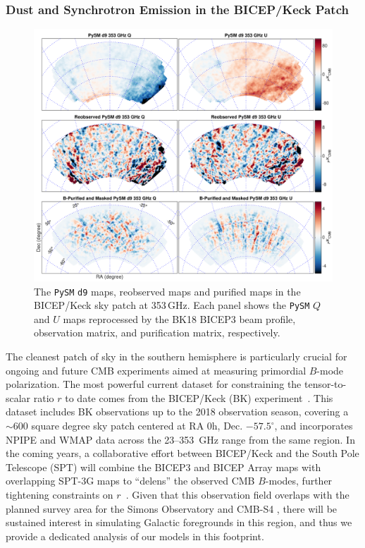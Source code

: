 \documentclass[twocolumn]{aastex631}
\begin{document}
\subsubsection{Dust and Synchrotron Emission in the BICEP/Keck Patch}
\label{sec:BK_validation}
\begin{figure}
    \centering
    \includegraphics[width=2.\columnwidth]{figures/pysm_d9_353_delta_reobs_B_pub.pdf}
    \caption{The \texttt{PySM} \texttt{d9} maps, reobserved maps and purified maps in the BICEP/Keck sky patch at 353\,GHz. Each panel shows the
    \texttt{PySM} $Q$ and $U$ maps reprocessed by the BK18 BICEP3 beam profile, observation matrix, and purification matrix, respectively.}
    \label{fig:psym_BKmatrix}
\end{figure}

The cleanest patch of sky in the southern hemisphere is particularly crucial for ongoing and future CMB experiments aimed at measuring primordial $B$-mode polarization. The most powerful current dataset for constraining the tensor-to-scalar ratio $r$ to date comes from the BICEP/Keck (BK) experiment~\citep[][henceforth ``BK18'']{Ade:2021}. This dataset includes BK observations up to the 2018 observation season, covering a $\sim 600$ square degree sky patch centered at RA 0h, Dec. $-57.5^{\circ}$, and incorporates NPIPE and WMAP data across the 23--353~GHz range from the same region. In the coming years, a collaborative effort between BICEP/Keck and the South Pole Telescope (SPT) will combine the BICEP3 and BICEP Array maps with overlapping SPT-3G maps to ``delens'' the observed CMB $B$-modes, further tightening constraints on $r$~\citep{TheBICEP/KeckCollaboration:2024}. Given that this observation field overlaps with the planned survey area for the Simons Observatory and CMB-S4 \citep{Ade:2019, Abazajian:2022}, there will be sustained interest in simulating Galactic foregrounds in this region, and thus we provide a dedicated analysis of our models in this footprint. 
\end{document}
